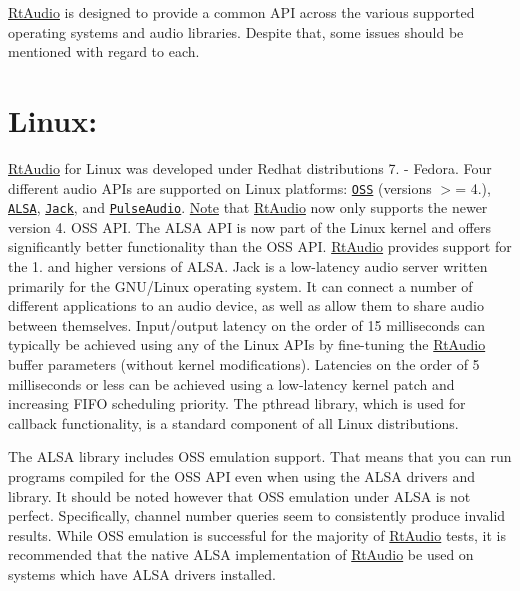 \hyperlink{class_rt_audio}{Rt\+Audio} is designed to provide a common A\+PI across the various supported operating systems and audio libraries. Despite that, some issues should be mentioned with regard to each.\hypertarget{apinotes_linux}{}\section{Linux\+:}\label{apinotes_linux}
\hyperlink{class_rt_audio}{Rt\+Audio} for Linux was developed under Redhat distributions 7. -\/ Fedora. Four different audio A\+P\+Is are supported on Linux platforms\+: \href{http://www.opensound.com/oss.html}{\tt O\+SS} (versions $>$= 4.), \href{http://www.alsa-project.org/}{\tt A\+L\+SA}, \href{http://jackit.sourceforge.net/}{\tt Jack}, and \href{http://www.freedesktop.org/wiki/Software/PulseAudio}{\tt Pulse\+Audio}. \hyperlink{class_note}{Note} that \hyperlink{class_rt_audio}{Rt\+Audio} now only supports the newer version 4. O\+SS A\+PI. The A\+L\+SA A\+PI is now part of the Linux kernel and offers significantly better functionality than the O\+SS A\+PI. \hyperlink{class_rt_audio}{Rt\+Audio} provides support for the 1. and higher versions of A\+L\+SA. Jack is a low-\/latency audio server written primarily for the G\+N\+U/\+Linux operating system. It can connect a number of different applications to an audio device, as well as allow them to share audio between themselves. Input/output latency on the order of 15 milliseconds can typically be achieved using any of the Linux A\+P\+Is by fine-\/tuning the \hyperlink{class_rt_audio}{Rt\+Audio} buffer parameters (without kernel modifications). Latencies on the order of 5 milliseconds or less can be achieved using a low-\/latency kernel patch and increasing F\+I\+FO scheduling priority. The pthread library, which is used for callback functionality, is a standard component of all Linux distributions.

The A\+L\+SA library includes O\+SS emulation support. That means that you can run programs compiled for the O\+SS A\+PI even when using the A\+L\+SA drivers and library. It should be noted however that O\+SS emulation under A\+L\+SA is not perfect. Specifically, channel number queries seem to consistently produce invalid results. While O\+SS emulation is successful for the majority of \hyperlink{class_rt_audio}{Rt\+Audio} tests, it is recommended that the native A\+L\+SA implementation of \hyperlink{class_rt_audio}{Rt\+Audio} be used on systems which have A\+L\+SA drivers installed.

